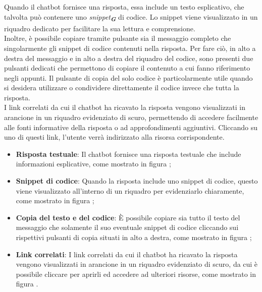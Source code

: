 Quando il chatbot fornisce una risposta, essa include un testo esplicativo, che talvolta può contenere uno \emph{snippet}\textsubscript{\textbf{\textit{G}}} di codice. Lo snippet viene visualizzato in un riquadro dedicato per facilitare la sua lettura e comprensione.\\
Inoltre, è possibile copiare tramite pulsante sia il messaggio completo che singolarmente gli snippet di codice contenuti nella risposta. Per fare ciò, in alto a destra del messaggio e in alto a destra del riquadro del codice, sono presenti due pulsanti dedicati che permettono di copiare il contenuto a cui fanno riferimento negli appunti. Il pulsante di copia del solo codice è particolarmente utile quando si desidera utilizzare o condividere direttamente il codice invece che tutta la risposta.\\
I link correlati da cui il chatbot ha ricavato la risposta vengono visualizzati in arancione in un riquadro evidenziato di scuro, permettendo di accedere facilmente alle fonti informative della risposta o ad approfondimenti aggiuntivi. Cliccando su uno di questi link, l'utente verrà indirizzato alla risorsa corrispondente.\\

\begin{itemize}
  \item \textbf{Risposta testuale}: Il chatbot fornisce una risposta testuale che include informazioni esplicative, come mostrato in figura ;
  \item \textbf{Snippet di codice}: Quando la risposta include uno snippet di codice, questo viene visualizzato all'interno di un riquadro per evidenziarlo chiaramente, come mostrato in figura ;
  \item \textbf{Copia del testo e del codice}: È possibile copiare sia tutto il testo del messaggio che solamente il suo eventuale snippet di codice cliccando sui rispettivi pulsanti di copia situati in alto a destra, come mostrato in figura ;
  \item \textbf{Link correlati}: I link correlati da cui il chatbot ha ricavato la risposta vengono visualizzati in arancione in un riquadro evidenziato di scuro, da cui è possibile cliccare per aprirli ed accedere ad ulteriori risorse, come mostrato in figura .
\end{itemize}

